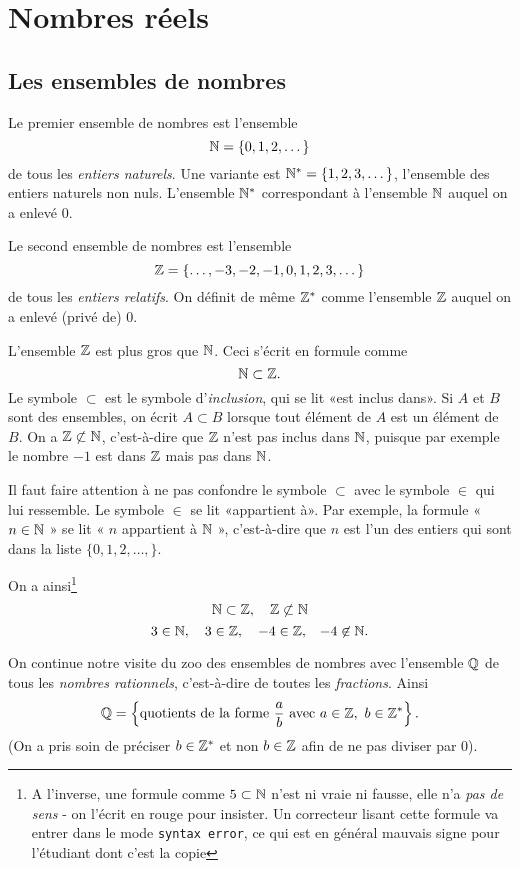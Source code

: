 \chapter{Nombres réels}

\section{Les ensembles de nombres}

Le premier ensemble de nombres est l'ensemble 
\[ \mathbb{N} = \{0,1,2,\dots\} \] 
de tous
les \emph{entiers naturels}. Une variante est $\mathbb{N}^* = \{1,2,3,\dots \}$, l'ensemble des entiers naturels non nuls. L'ensemble $\mathbb{N}^*$ correspondant à l'ensemble $\mathbb{N}$ auquel on a enlevé $0$.

Le second ensemble de nombres est l'ensemble
\[ \mathbb{Z} = \{ \dots, -3,-2,-1,0,1,2,3, \dots \} \]
de tous les \emph{entiers relatifs}. On définit de même $\mathbb{Z}^*$ comme l'ensemble $\mathbb{Z}$ auquel on a enlevé (privé de) $0$.

L'ensemble $\mathbb{Z}$ est plus gros que $\mathbb{N}$. Ceci s'écrit en formule comme
\[ \mathbb{N} \subset \mathbb{Z} .\]
Le symbole $\subset$ est le symbole d'\emph{inclusion}, qui se lit «est inclus dans». Si $A$ et $B$ sont des ensembles, on écrit $A \subset B$ lorsque tout élément de $A$ est un élément de $B$. On a $\mathbb{Z} \not \subset \mathbb{N}$, c'est-à-dire que $\mathbb{Z}$ n'est pas inclus dans $\mathbb{N}$, puisque par exemple le nombre $-1$ est dans $\mathbb{Z}$ mais pas dans $\mathbb{N}$.

Il faut faire attention à ne pas confondre le symbole $\subset$ avec le symbole $\in$ qui lui ressemble. Le symbole $\in$ se lit «appartient à». Par exemple, la formule « $n \in \mathbb{N}$ » se lit « $n$ appartient à $\mathbb{N}$ », c'est-à-dire que $n$ est l'un des entiers qui sont dans la liste $\{0,1,2,\dots,\}$.

On a ainsi\footnote{A l'inverse, une formule comme \textcolor{red}{$5 \subset \mathbb{N}$} n'est ni vraie ni fausse, elle n'a \emph{pas de sens} - on l'écrit en rouge pour insister. Un correcteur lisant cette formule va entrer dans le mode \verb!syntax error!, ce qui est en général mauvais signe pour l'étudiant dont c'est la copie}
\[ \mathbb{N} \subset \mathbb{Z} , \ \ \ \mathbb{Z} \not\subset \mathbb{N} \]
\[ 3 \in \N , \ \ \ 3 \in \Z , \ \ \ -4 \in \Z, \ \ \, -4 \not\in \N .\]

On continue notre visite du zoo des ensembles de nombres avec l'ensemble $\mathbb{Q}$ de tous les \emph{nombres rationnels}, c'est-à-dire de toutes les \emph{fractions}. Ainsi
\[ \mathbb{Q} = \left\{ \textnormal{quotients de la forme } \frac{a}{b} \textnormal{ avec } a \in \mathbb{Z},\ b \in \mathbb{Z}^* \right\}.\]
(On a pris soin de préciser $b \in \mathbb{Z}^*$ et non $b \in \mathbb{Z}$ afin de ne pas diviser par $0$).

